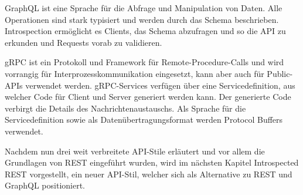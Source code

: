 GraphQL ist eine Sprache für die Abfrage und Manipulation von Daten. Alle Operationen sind stark typisiert und werden durch das Schema beschrieben. Introspection ermöglicht es Clients, das Schema abzufragen und so die API zu erkunden und Requests vorab zu validieren.

gRPC ist ein Protokoll und Framework für Remote-Procedure-Calls und wird vorrangig für Interprozesskommunikation eingesetzt, kann aber auch für Public-APIs verwendet werden. gRPC-Services verfügen über eine Servicedefinition, aus welcher Code für Client und Server generiert werden kann. Der generierte Code verbirgt die Details des Nachrichtenaustauschs. Als Sprache für die Servicedefinition sowie als Datenübertragungsformat werden Protocol Buffers verwendet.

\para{}Nachdem nun drei weit verbreitete API-Stile erläutert und vor allem die Grundlagen von REST eingeführt wurden, wird im nächsten Kapitel Introspected REST vorgestellt, ein neuer API-Stil, welcher sich als Alternative zu REST und GraphQL positioniert.